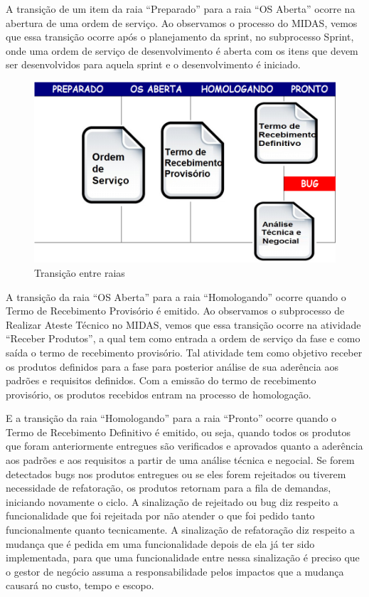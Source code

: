 A transição de um item da raia “Preparado” para a raia “OS Aberta” ocorre na abertura de uma ordem de serviço. Ao observamos o processo do MIDAS, vemos que essa transição ocorre após o planejamento da sprint, no subprocesso Sprint, onde uma ordem de serviço de desenvolvimento é aberta  com os itens que devem ser desenvolvidos para aquela sprint e o desenvolvimento é iniciado. 


\begin{figure}[H]
		\centering
		\label{fig07}
			\includegraphics[scale=0.5]{figuras/kanbanIPHAN3.png}
		\caption{Transição entre raias \cite{parente}}
\end{figure}

A transição da raia “OS Aberta” para a raia “Homologando” ocorre quando o Termo de Recebimento Provisório é emitido. Ao observamos o subprocesso de Realizar Ateste Técnico no MIDAS, vemos que essa transição ocorre na atividade “Receber Produtos”, a qual tem como entrada a ordem de serviço da fase e como saída o termo de recebimento provisório. Tal atividade tem como objetivo receber os produtos definidos para a fase para posterior análise de sua aderência aos padrões e requisitos definidos. Com a emissão do termo de recebimento provisório, os produtos recebidos entram na processo de homologação. 

E a transição da raia “Homologando” para a raia “Pronto” ocorre quando o Termo de Recebimento Definitivo é emitido, ou seja, quando todos os produtos que foram anteriormente entregues são verificados e aprovados quanto a aderência aos padrões e aos requisitos a partir de uma análise técnica e negocial. Se forem detectados bugs nos produtos entregues ou se eles forem rejeitados ou tiverem necessidade de refatoração, os produtos retornam para a fila de demandas, iniciando novamente o ciclo. A sinalização de rejeitado ou bug diz respeito a funcionalidade que foi rejeitada por não atender o que foi pedido tanto funcionalmente quanto tecnicamente. A sinalização de refatoração diz respeito a mudança que é pedida em uma funcionalidade depois de ela já ter sido implementada, para que uma funcionalidade entre nessa sinalização é preciso que o gestor de negócio assuma a responsabilidade pelos impactos que a mudança causará no custo, tempo e escopo.


